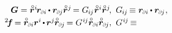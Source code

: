  

\nopagebreak\vspace{-0.1em}\begin{equation*}%
\begin{array}{r@{\hspace{.5em}}l}
\bm{G} = \initiallocationvector^i \hspace{-0.25ex} \currentlocationvector_\differentialindex{i} \hspace{-0.1ex} \dotp \currentlocationvector_\differentialindex{\hspace{-0.1ex}j} \initiallocationvector^j \hspace{-0.25ex}
= G_{\hspace{-0.15ex}i\hspace{-0.1ex}j} \hspace{.1ex} \initiallocationvector^i \initiallocationvector^j
\hspace{-0.3ex} , &
G_{\hspace{-0.15ex}i\hspace{-0.1ex}j} \hspace{-0.2ex} \equiv
\currentlocationvector_\differentialindex{i} \hspace{-0.1ex} \dotp \currentlocationvector_\differentialindex{\hspace{-0.1ex}j}
\hspace{.1ex} ,
\\[.25em]
%
{{^2}\hspace{-0.4ex}\bm{f}} \hspace{-0.2ex} =  \initiallocationvector_\differentialindex{i} \currentlocationvector^{i} \hspace{-0.2ex} \dotp \hspace{-0.15ex} \currentlocationvector^j \hspace{-0.1ex} \initiallocationvector_\differentialindex{\hspace{-0.1ex}j} \hspace{-0.2ex}
= G^{\hspace{.1ex}i\hspace{-0.1ex}j} \initiallocationvector_\differentialindex{i} \initiallocationvector_\differentialindex{\hspace{-0.1ex}j} \hspace{-0.2ex}
\hspace{.2ex} , &
G^{\hspace{.1ex}i\hspace{-0.1ex}j} \hspace{-0.2ex} \equiv

\end{array}
\end{equation*}
